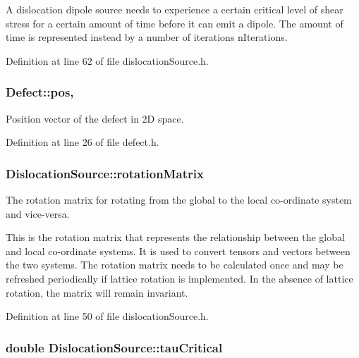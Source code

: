 A dislocation dipole source needs to experience a certain critical level of shear stress for a certain amount of time before it can emit a dipole. The amount of time is represented instead by a number of iterations n\-Iterations. 

Definition at line 62 of file dislocation\-Source.\-h.

\hypertarget{classDefect_aed2731c1beefc22e3db6ad5b18194cdd}{
\subsubsection[{pos}]{ Defect\-::pos\hspace{0.3cm}{\ttfamily [protected]}, {\ttfamily [inherited]}}}\label{d5/d4f/classDefect_aed2731c1beefc22e3db6ad5b18194cdd}


Position vector of the defect in 2\-D space. 



Definition at line 26 of file defect.\-h.

\hypertarget{classDislocationSource_a3bb826a0646d5c5546045cbf8d523b4f}{
\subsubsection[{rotation\-Matrix}]{ Dislocation\-Source\-::rotation\-Matrix\hspace{0.3cm}{\ttfamily [protected]}}}\label{de/de3/classDislocationSource_a3bb826a0646d5c5546045cbf8d523b4f}


The rotation matrix for rotating from the global to the local co-\/ordinate system and vice-\/versa. 

This is the rotation matrix that represents the relationship between the global and local co-\/ordinate systems. It is used to convert tensors and vectors between the two systems. The rotation matrix needs to be calculated once and may be refreshed periodically if lattice rotation is implemented. In the absence of lattice rotation, the matrix will remain invariant. 

Definition at line 50 of file dislocation\-Source.\-h.

\hypertarget{classDislocationSource_ad91294a3ab5b6f6156a2ad67b9df954e}{
\subsubsection[{tau\-Critical}]{\setlength{\rightskip}{0pt plus 5cm}double Dislocation\-Source\-::tau\-Critical\hspace{0.3cm}{\ttfamily [protected]}}}\label{de/de3/classDislocationSource_ad91294a3ab5b6f6156a2ad67b9df954e}


